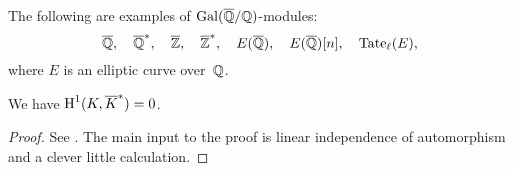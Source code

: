 \begin{example}
The following are examples of $\operatorname{Gal}(\overline{\mathbb{Q}}/\mathbb{Q})$-modules:
$$
  \overline{\mathbb{Q}},\quad \overline{\mathbb{Q}}^*,\quad \overline{\mathbb{Z}},\quad\overline{\mathbb{Z}}^*,\quad E(\overline{\mathbb{Q}}),\quad
 E(\overline{\mathbb{Q}})[n], \quad {\rm Tate}_{\ell}(E),
$$
where $E$ is an elliptic curve over~$\mathbb{Q}$.
\end{example}

\begin{theorem}[Hilbert 90]\label{thm:h90}
We have $\operatorname{H}^1(K,\overline{K}^*) = 0$.
\end{theorem}
\begin{proof}
See \cite{serre:localfields}.  The main input to the proof is linear
independence of automorphism and a clever little calculation.
\end{proof}

